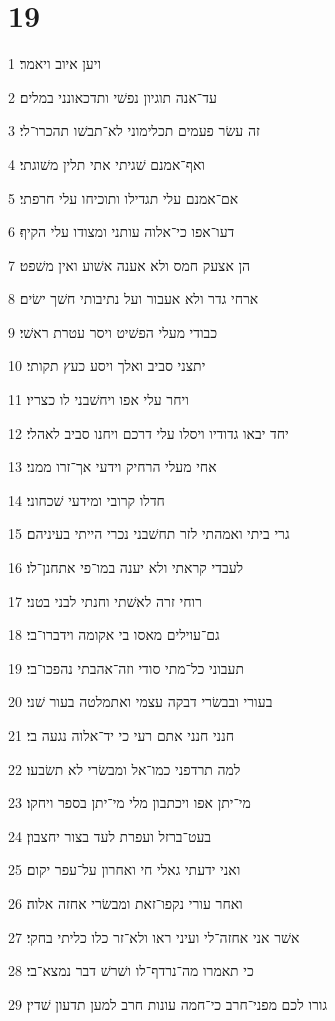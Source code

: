 \chapter{19}

\par 1 ויען איוב ויאמר׃
\par 2 עד־אנה תוגיון נפשׁי ותדכאונני במלים׃
\par 3 זה עשׂר פעמים תכלימוני לא־תבשׁו תהכרו־לי׃
\par 4 ואף־אמנם שׁגיתי אתי תלין משׁוגתי׃
\par 5 אם־אמנם עלי תגדילו ותוכיחו עלי חרפתי׃
\par 6 דעו־אפו כי־אלוה עותני ומצודו עלי הקיף׃
\par 7 הן אצעק חמס ולא אענה אשׁוע ואין משׁפט׃
\par 8 ארחי גדר ולא אעבור ועל נתיבותי חשׁך ישׂים׃
\par 9 כבודי מעלי הפשׁיט ויסר עטרת ראשׁי׃
\par 10 יתצני סביב ואלך ויסע כעץ תקותי׃
\par 11 ויחר עלי אפו ויחשׁבני לו כצריו׃
\par 12 יחד יבאו גדודיו ויסלו עלי דרכם ויחנו סביב לאהלי׃
\par 13 אחי מעלי הרחיק וידעי אך־זרו ממני׃
\par 14 חדלו קרובי ומידעי שׁכחוני׃
\par 15 גרי ביתי ואמהתי לזר תחשׁבני נכרי הייתי בעיניהם׃
\par 16 לעבדי קראתי ולא יענה במו־פי אתחנן־לו׃
\par 17 רוחי זרה לאשׁתי וחנתי לבני בטני׃
\par 18 גם־עוילים מאסו בי אקומה וידברו־בי׃
\par 19 תעבוני כל־מתי סודי וזה־אהבתי נהפכו־בי׃
\par 20 בעורי ובבשׂרי דבקה עצמי ואתמלטה בעור שׁני׃
\par 21 חנני חנני אתם רעי כי יד־אלוה נגעה בי׃
\par 22 למה תרדפני כמו־אל ומבשׂרי לא תשׂבעו׃
\par 23 מי־יתן אפו ויכתבון מלי מי־יתן בספר ויחקו׃
\par 24 בעט־ברזל ועפרת לעד בצור יחצבון׃
\par 25 ואני ידעתי גאלי חי ואחרון על־עפר יקום׃
\par 26 ואחר עורי נקפו־זאת ומבשׂרי אחזה אלוה׃
\par 27 אשׁר אני אחזה־לי ועיני ראו ולא־זר כלו כליתי בחקי׃
\par 28 כי תאמרו מה־נרדף־לו ושׁרשׁ דבר נמצא־בי׃
\par 29 גורו לכם מפני־חרב כי־חמה עונות חרב למען תדעון שׁדין׃

